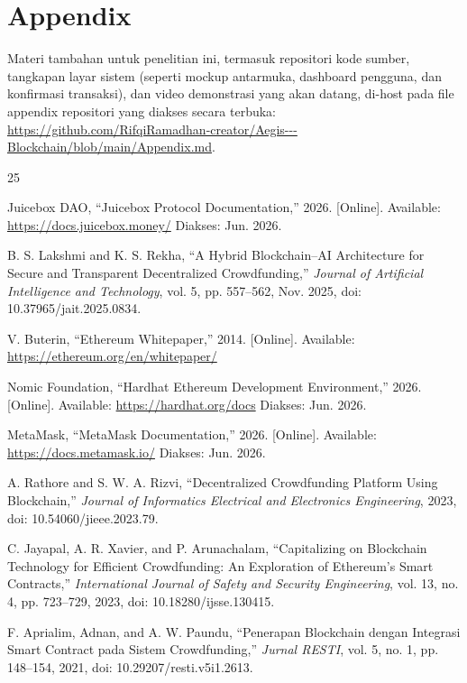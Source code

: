 \documentclass[conference]{IEEEtran}
\begin{document}
\section*{Appendix}
Materi tambahan untuk penelitian ini, termasuk repositori kode sumber, tangkapan layar sistem (seperti mockup antarmuka, dashboard pengguna, dan konfirmasi transaksi), dan video demonstrasi yang akan datang, di-host pada file appendix repositori yang diakses secara terbuka: \url{https://github.com/RifqiRamadhan-creator/Aegis---Blockchain/blob/main/Appendix.md}.

\begin{thebibliography}{25}

Juicebox DAO, ``Juicebox Protocol Documentation,'' 2026. [Online]. Available: \url{https://docs.juicebox.money/} Diakses: Jun. 2026.

B. S. Lakshmi and K. S. Rekha, ``A Hybrid Blockchain--AI Architecture for Secure and Transparent Decentralized Crowdfunding,'' \textit{Journal of Artificial Intelligence and Technology}, vol. 5, pp. 557--562, Nov. 2025, doi: 10.37965/jait.2025.0834.

V. Buterin, ``Ethereum Whitepaper,'' 2014. [Online]. Available: \url{https://ethereum.org/en/whitepaper/}

Nomic Foundation, ``Hardhat Ethereum Development Environment,'' 2026. [Online]. Available: \url{https://hardhat.org/docs} Diakses: Jun. 2026.

MetaMask, ``MetaMask Documentation,'' 2026. [Online]. Available: \url{https://docs.metamask.io/} Diakses: Jun. 2026.

A. Rathore and S. W. A. Rizvi, ``Decentralized Crowdfunding Platform Using Blockchain,'' \textit{Journal of Informatics Electrical and Electronics Engineering}, 2023, doi: 10.54060/jieee.2023.79.

C. Jayapal, A. R. Xavier, and P. Arunachalam, ``Capitalizing on Blockchain Technology for Efficient Crowdfunding: An Exploration of Ethereum's Smart Contracts,'' \textit{International Journal of Safety and Security Engineering}, vol. 13, no. 4, pp. 723--729, 2023, doi: 10.18280/ijsse.130415.

F. Aprialim, Adnan, and A. W. Paundu, ``Penerapan Blockchain dengan Integrasi Smart Contract pada Sistem Crowdfunding,'' \textit{Jurnal RESTI}, vol. 5, no. 1, pp. 148--154, 2021, doi: 10.29207/resti.v5i1.2613.


\end{thebibliography}
\end{document}
